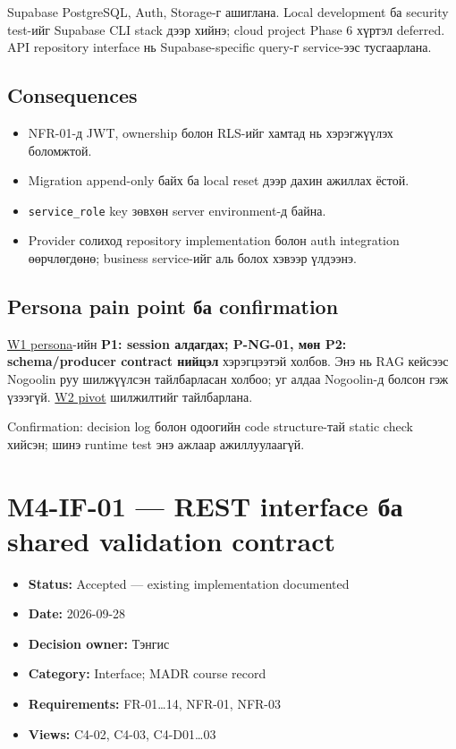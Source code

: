 \documentclass[
  mongolian,
]{article}
\providecommand{\tightlist}{%
  \setlength{\itemsep}{0pt}\setlength{\parskip}{0pt}}
\begin{document}
Supabase PostgreSQL, Auth, Storage-г ашиглана. Local development ба
security test-ийг Supabase CLI stack дээр хийнэ; cloud project Phase 6
хүртэл deferred. API repository interface нь Supabase-specific query-г
service-ээс тусгаарлана.

\subsection{Consequences}\label{consequences-1}

\begin{itemize}
\tightlist
\item
  NFR-01-д JWT, ownership болон RLS-ийг хамтад нь хэрэгжүүлэх боломжтой.
\item
  Migration append-only байх ба local reset дээр дахин ажиллах ёстой.
\item
  \texttt{service\_role} key зөвхөн server environment-д байна.
\item
  Provider солиход repository implementation болон auth integration
  өөрчлөгдөнө; business service-ийг аль болох хэвээр үлдээнэ.
\end{itemize}

\subsection{Persona pain point ба
confirmation}\label{persona-pain-point-ux431ux430-confirmation-1}

\href{https://github.com/Tengis01/Nogoolin/blob/main/docs/ICSI438/sem1/wiki/02_audience_persona.md}{W1
persona}-ийн \textbf{P1: session алдагдах; P-NG-01, мөн P2:
schema/producer contract нийцэл} хэрэгцээтэй холбов. Энэ нь RAG кейсээс
Nogoolin руу шилжүүлсэн тайлбарласан холбоо; уг алдаа Nogoolin-д болсон
гэж үзээгүй.
\href{https://github.com/Tengis01/Nogoolin/blob/main/docs/ICSI438/sem2/wiki/persona-and-pivot.md}{W2
pivot} шилжилтийг тайлбарлана.

Confirmation: decision log болон одоогийн code structure-тай static
check хийсэн; шинэ runtime test энэ ажлаар ажиллуулаагүй.

\newpage

\section{M4-IF-01 --- REST interface ба shared validation
contract}\label{m4-if-01-rest-interface-ux431ux430-shared-validation-contract}

\begin{itemize}
\tightlist
\item
  \textbf{Status:} Accepted --- existing implementation documented
\item
  \textbf{Date:} 2026-09-28
\item
  \textbf{Decision owner:} Тэнгис
\item
  \textbf{Category:} Interface; MADR course record
\item
  \textbf{Requirements:} FR-01\ldots14, NFR-01, NFR-03
\item
  \textbf{Views:} C4-02, C4-03, C4-D01\ldots03
\end{itemize}
\end{document}
